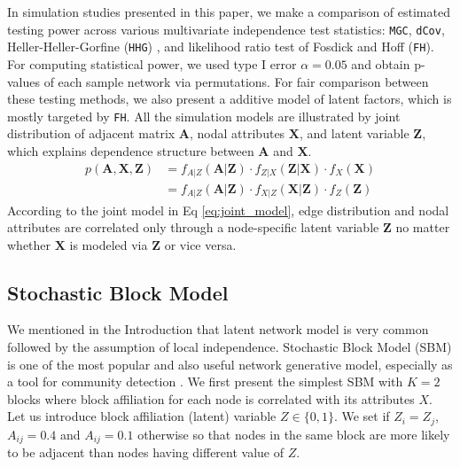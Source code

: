 \documentclass[12pt]{article}
\theoremstyle{definition}
\begin{document}
In simulation studies presented in this paper, we make a comparison of estimated testing power across various multivariate independence test statistics: \texttt{MGC}, \texttt{dCov}, Heller-Heller-Gorfine (\texttt{HHG}) \citep{heller2012consistent}, and likelihood ratio test of Fosdick and Hoff (\texttt{FH}). For computing statistical power, we used type I error $\alpha = 0.05$ and obtain p-values of each sample network via permutations. For fair comparison between these testing methods, we also present a additive model of latent factors, which is mostly targeted by \texttt{FH}.  All the simulation models are illustrated by joint distribution of adjacent matrix $\mathbf{A}$, nodal attributes $\mathbf{X}$, and latent variable $\mathbf{Z}$, which explains dependence structure between $\mathbf{A}$ and $\mathbf{X}$. 
\begin{equation}
\begin{split}
p(\mathbf{A}, \mathbf{X}, \mathbf{Z}) & = f_{A | Z}(\mathbf{A} | \mathbf{Z}) \cdot f_{Z | X}(\mathbf{Z} | \mathbf{X}) \cdot f_{X}(\mathbf{X}) 
\\ & = f_{A | Z}(\mathbf{A} | \mathbf{Z}) \cdot  f_{X | Z}(\mathbf{X} | \mathbf{Z} ) \cdot f_{Z} (\mathbf{Z}) 
\end{split}
\label{eq:joint_model}
\end{equation}	
According to the joint model in Eq \ref{eq:joint_model}, edge distribution and nodal attributes are correlated only through a node-specific latent variable $\mathbf{Z}$ no matter whether $\mathbf{X}$ is modeled via $\mathbf{Z}$ or vice versa.
		
\subsection{Stochastic Block Model}

We mentioned in the Introduction that latent network model is very common followed by the assumption of local independence. Stochastic Block Model (SBM) is one of the most popular and also useful network generative model, especially as a tool for community detection \citep{karrer2011stochastic}. We first present the simplest SBM with $K = 2$ blocks where block affiliation for each node is correlated with its attributes $X$. Let us introduce block affiliation (latent) variable $Z \in \{ 0, 1 \}$. We set if $Z_{i}  = Z_{j}$, $A_{ij} = 0.4$ and $A_{ij} = 0.1$  otherwise so that nodes in the same block are more likely to be adjacent than nodes having different value of $Z$. 
	
\end{document}
